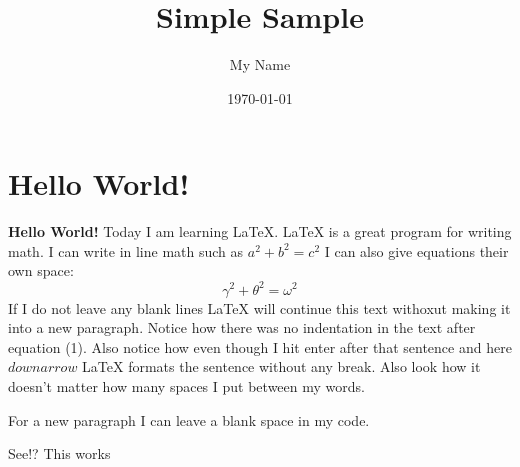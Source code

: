 \documentclass{article} %
\title{Simple Sample} %
\author{My Name} %
\date{\today} %
\begin{document}
\maketitle %

\section{Hello World!} %

\textbf{Hello World!} Today I am learning \LaTeX. %
\LaTeX{} is a great program for writing math. I can write in line math such as \(a^2+b^2=c^2\) %
I can also give equations their own space:
\begin{equation} %
    \gamma^2+\theta^2=\omega^2
\end{equation}
If I do not leave any blank lines \LaTeX{} will continue  this text withoxut making it into a new paragraph.  Notice how there was no indentation in the text after equation (1).
Also notice how even though I hit enter after that sentence and here \(downarrow\)
\LaTeX{} formats the sentence without any break.  Also   look  how      it   doesn't     matter          how    many  spaces     I put     between       my    words.

For a new paragraph I can leave a blank space in my code.

See!? This works
\end{document}
